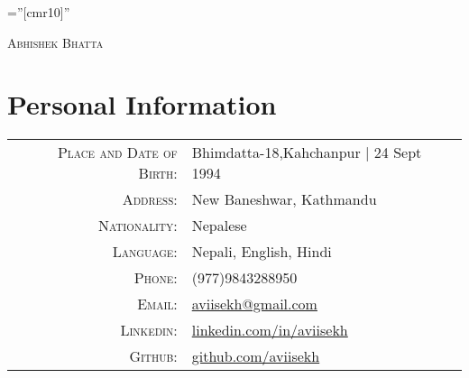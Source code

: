 \documentclass[a4paper,10pt]{article}
\begin{document}

\pagestyle{empty} %

\font\fb=''[cmr10]'' %

\par{\centering
		{\huge \textsc{Abhishek} \textsc{Bhatta}
	}\bigskip\par}


\section{Personal Information}

\begin{tabular}{rl}
    \textsc{Place and Date of Birth:} & Bhimdatta-18,Kahchanpur  | 24 Sept 1994 \\
    \textsc{Address:}   & New Baneshwar, Kathmandu \\
    \textsc{Nationality:} & Nepalese\\
    \textsc{Language:} & Nepali, English, Hindi\\
    \textsc{Phone:}     & (977)9843288950\\
    \textsc{Email:}     & \href{mailto:aviisekh@gmail.com}{aviisekh@gmail.com}\\
    \textsc{Linkedin:} & \href{https://www.linkedin.com/in/aviisekh}{linkedin.com/in/aviisekh}\\
    \textsc{Github:} & \href{https://www.github.com/aviisekh}{github.com/aviisekh}\\
\end{tabular}

\end{document}
